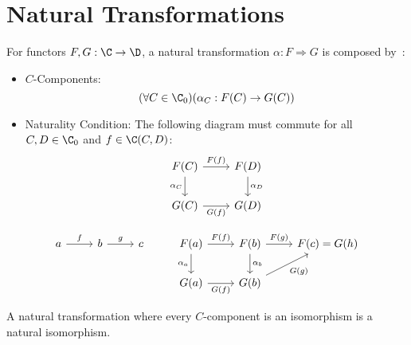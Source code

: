 \section{Natural Transformations}

\begin{definition}
  For functors $F, G:\C \to \D$, a natural transformation $\alpha : F
  \Rightarrow G$ is composed
  by~\parencite[p.~28]{leinster:basic_category_theory}:
  \begin{itemize}
    \item $C$-Components:
      \[(\forall C\in \C_0)(\alpha_C : F(C) \to G(C))\]
    \item Naturality Condition: The following diagram must commute for all
      $C,D\in \C_0$ and $f \in \C(C, D)$:
      \[\begin{tikzcd}[ampersand replacement=\&]
        {F(C)} \& {F(D)} \\
        {G(C)} \& {G(D)}
        \arrow["{\alpha_C}"', from=1-1, to=2-1]
        \arrow["{\alpha_{D}}", from=1-2, to=2-2]
        \arrow["{F(f)}", from=1-1, to=1-2]
        \arrow["{G(f)}"', from=2-1, to=2-2]
      \end{tikzcd}\]
  \end{itemize}
\end{definition}

\begin{example}
  \[\begin{tikzcd}[ampersand replacement=\&]
    a \& b \& c \& {F(a)} \& {F(b)} \& {F(c)=G(h)} \\
    \&\&\& {G(a)} \& {G(b)}
    \arrow["{\alpha_a}"', from=1-4, to=2-4]
    \arrow["{\alpha_b}", from=1-5, to=2-5]
    \arrow["{F(f)}", from=1-4, to=1-5]
    \arrow["{G(f)}"', from=2-4, to=2-5]
    \arrow["f", from=1-1, to=1-2]
    \arrow["g", from=1-2, to=1-3]
    \arrow["{F(g)}", from=1-5, to=1-6]
    \arrow["{G(g)}"', from=2-5, to=1-6]
  \end{tikzcd}\]
\end{example}

\begin{remark}
  A natural transformation where every $C$-component is an isomorphism is a
  natural isomorphism.
\end{remark}





